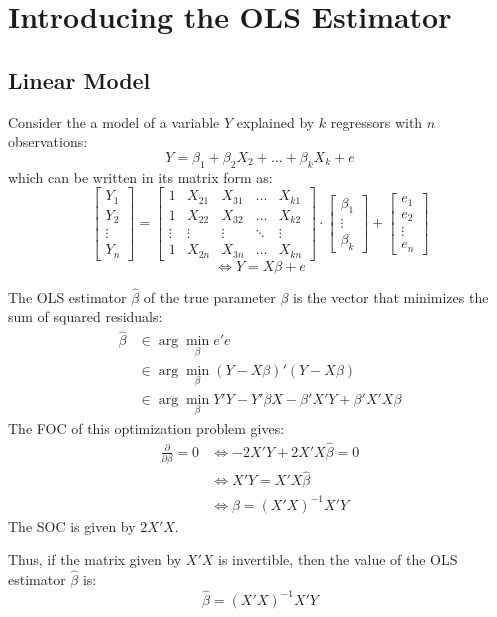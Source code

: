 \section{Introducing the OLS Estimator}

\subsection{Linear Model}

Consider the a model of a variable $Y$ explained by $k$ regressors with $n$ observations: $$Y = \beta_1 + \beta_{2}X_{2} + ... + \beta_kX_{k} + e$$ which can be written in its matrix form as:\[
\begin{bmatrix}
    Y_{1}\\
    Y_{2}\\
    \vdots\\
    Y_{n}
\end{bmatrix}
=
\begin{bmatrix}
    1       & X_{21} & X_{31} & \dots & X_{k1} \\
    1       & X_{22} & X_{32} & \dots & X_{k2} \\
    \vdots & \vdots & \vdots & \ddots & \vdots \\
    1       & X_{2n} & X_{3n} & \dots & X_{kn}
\end{bmatrix}
\cdot
\begin{bmatrix}
    \beta_1 \\
    \vdots \\
    \beta_k
\end{bmatrix}
+ 
\begin{bmatrix}
    e_{1}\\
    e_{2}\\
    \vdots\\
    e_{n}
\end{bmatrix}
\]
$$\Leftrightarrow Y = X\beta + e $$

\begin{definition}
The OLS estimator $\hat\beta$ of the true parameter $\beta$ is the vector that minimizes the sum of squared residuals:\begin{align*}
\hat\beta & \in \operatorname{arg}\min_{\beta} e'e\\
& \in \operatorname{arg}\min_{\beta} (Y -  X\beta)'(Y -  X\beta) \\
& \in \operatorname{arg}\min_{\beta} Y'Y - Y'\beta X - \beta'X'Y + \beta'X'X\beta
\end{align*} 
The FOC of this optimization problem gives:\begin{align*}
\frac{\partial }{\partial \beta} = 0 & \Leftrightarrow -2X'Y + 2X'X\hat\beta = 0 \\ & \Leftrightarrow X'Y=X'X\hat\beta \\ & \Leftrightarrow \hat\beta=(X'X)^{-1}X'Y
\end{align*}
The SOC is given by $2X'X$.

Thus, if the matrix given by $X'X$ is invertible, then the value of the OLS estimator $\hat\beta$ is:$$\hat\beta=(X'X)^{-1}X'Y$$
\end{definition}


